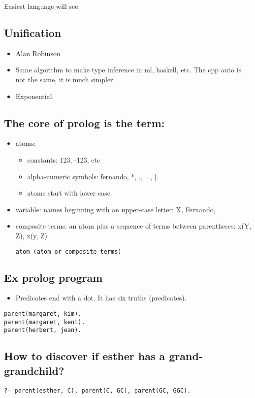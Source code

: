 \documentclass[11pt]{article}
\begin{document}
Easiest language will see.
\subsection{Unification}
\label{sec:org94c5a9d}
\begin{itemize}
\item Alan Robinson
\item Same algorithm to make type inference in ml, haskell, etc.
The cpp auto is not the same, it is much simpler.
\item Exponential.
\end{itemize}
\subsection{The core of prolog is the term:}
\label{sec:orgfe3bd85}
\begin{itemize}
\item atoms:
\begin{itemize}
\item constants: 123, -123, etc
\item alpha-numeric symbols: fernando, *, ., =, [.
\item atoms start with lower case.
\end{itemize}
\item variable: names beginning with an upper-case letter:
X, Fernando, \_
\item composite terms: an atom plus a sequence of terms between parentheses:
x(Y, Z), x(y, Z)

\begin{verbatim}
atom (atom or composite terms)
\end{verbatim}
\end{itemize}
\subsection{Ex prolog program}
\label{sec:orgf13ce17}
\begin{itemize}
\item Predicates end with a dot. It has six truths (predicates).
\end{itemize}
\begin{verbatim}
parent(margaret, kim).
parent(margaret, kent).
parent(herbert, jean).
\end{verbatim}
\subsection{How to discover if esther has a grand-grandchild?}
\label{sec:org5c71abb}
\begin{verbatim}
?- parent(esther, C), parent(C, GC), parent(GC, GGC).
\end{verbatim}
\end{document}
